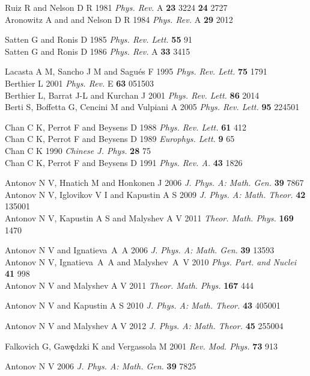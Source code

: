 \documentclass[12pt]{iopart}
\begin{document}
\begin{thebibliography}{99}
 Ruiz R and Nelson D R 1981 {\it Phys. Rev.} A {\bf 23}
3224 {\bf 24} 2727 \\
Aronowitz A and and Nelson D R 1984 {\it Phys. Rev.} A {\bf 29} 2012

 Satten G and Ronis D 1985 {\it Phys. Rev. Lett.}
{\bf 55} 91 \\
Satten G and Ronis D 1986 {\it Phys. Rev.} A {\bf 33} 3415

 Lacasta  A M, Sancho J M and Sagu\'es F 1995
{\it Phys. Rev. Lett.} {\bf 75} 1791 \\
Berthier L 2001 {\it Phys. Rev.} E {\bf 63} 051503 \\
Berthier L, Barrat J-L and Kurchan J 2001 {\it Phys. Rev. Lett.}
{\bf 86} 2014 \\
Berti S, Boffetta G, Cencini M and Vulpiani A 2005
{\it Phys. Rev. Lett.} {\bf 95} 224501


 Chan C K, Perrot F and Beysens D 1988 {\it Phys. Rev. Lett.}
{\bf 61} 412 \\
Chan C K, Perrot F and Beysens D 1989 {\it Europhys. Lett.} {\bf 9} 65 \\
Chan C K 1990 {\it Chinese J. Phys.} {\bf 28} 75 \\
Chan C K, Perrot F and Beysens D 1991 {\it Phys. Rev. A.} {\bf 43} 1826


 Antonov N V, Hnatich M and Honkonen J 2006
{\it J. Phys. A: Math. Gen.} {\bf 39} 7867 \\
Antonov N V, Iglovikov V I and Kapustin A S 2009
{\it J. Phys. A: Math. Theor.} {\bf 42} 135001 \\
Antonov N V, Kapustin A S and Malyshev A V 2011
{\it Theor. Math. Phys.} {\bf 169} 1470

 Antonov N V and Ignatieva~A~A 2006
{\it J. Phys. A: Math. Gen.} {\bf 39} 13593 \\
Antonov N V, Ignatieva~A~A and Malyshev~A~V 2010
{\it Phys. Part. and Nuclei} {\bf 41} 998 \\
Antonov N V and Malyshev A V 2011
{\it Theor. Math. Phys.} {\bf 167} 444

 Antonov N V and Kapustin A S 2010
{\it J. Phys. A: Math. Theor.} {\bf 43} 405001

 Antonov N V and Malyshev A V 2012
{\it J. Phys. A: Math. Theor.} {\bf 45} 255004

 Falkovich G, Gaw\c{e}dzki K and Vergassola M 2001
{\it Rev. Mod. Phys.} {\bf 73} 913

 Antonov N V 2006 {\it J. Phys. A: Math. Gen.} {\bf 39}
7825



\end{thebibliography}
\end{document}

